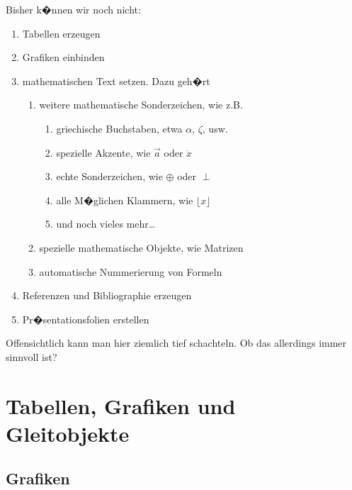 \documentclass[11pt,a4paper]{article} %
\begin{document}
Bisher k�nnen wir noch nicht:

\begin{enumerate}
 \item Tabellen erzeugen
 \item Grafiken einbinden
 \item mathematischen Text setzen. Dazu geh�rt
    \begin{enumerate}
       \item weitere mathematische Sonderzeichen, wie z.B.
           \begin{enumerate}
               \item griechische Buchstaben, etwa $\alpha$, $\zeta$, usw.
               \item spezielle Akzente, wie $\vec{a}$ oder $\ddot{x}$
               \item echte Sonderzeichen, wie $\oplus$ oder $\perp$
               \item alle M�glichen Klammern, wie $\lfloor x \rfloor$
               \item und noch vieles mehr\ldots
           \end{enumerate}
       \item spezielle mathematische Objekte, wie Matrizen
       \item automatische Nummerierung von Formeln
    \end{enumerate}
 \item Referenzen und Bibliographie erzeugen
 \item Pr�sentationsfolien erstellen
\end{enumerate}

Offensichtlich kann man hier ziemlich tief schachteln. Ob das allerdings immer sinnvoll ist?



\section{Tabellen, Grafiken und Gleitobjekte}
\label{TabellenGrafikenFloats}


\subsection{Grafiken}
\label{Grafiken}
\end{document}
